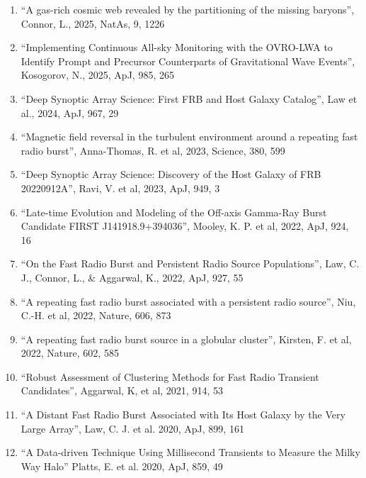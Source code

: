 \documentclass[11pt]{article}
\begin{document}
\begin{enumerate}

    \item ``A gas-rich cosmic web revealed by the partitioning of the missing baryons'', Connor, L., 2025, NatAs, 9, 1226

    \item ``Implementing Continuous All-sky Monitoring with the OVRO-LWA to Identify Prompt and Precursor Counterparts of Gravitational Wave Events'', Kosogorov, N., 2025, ApJ, 985, 265

    \item ``Deep Synoptic Array Science: First FRB and Host Galaxy Catalog'', Law et al., 2024, ApJ, 967, 29

    \item ``Magnetic field reversal in the turbulent environment around a repeating fast radio burst'', Anna-Thomas, R. et al, 2023, Science, 380, 599

    \item ``Deep Synoptic Array Science: Discovery of the Host Galaxy of FRB 20220912A'', Ravi, V. et al, 2023, ApJ, 949, 3

    \item ``Late-time Evolution and Modeling of the Off-axis Gamma-Ray Burst Candidate FIRST J141918.9+394036'', Mooley, K. P. et al, 2022, ApJ, 924, 16

    \item ``On the Fast Radio Burst and Persistent Radio Source Populations'', Law, C. J., Connor, L., \& Aggarwal, K., 2022, ApJ, 927, 55

    \item ``A repeating fast radio burst associated with a persistent radio source'', Niu, C.-H. et al, 2022, Nature, 606, 873

    \item ``A repeating fast radio burst source in a globular cluster'', Kirsten, F. et al, 2022, Nature, 602, 585

    \item ``Robust Assessment of Clustering Methods for Fast Radio Transient Candidates'', Aggarwal, K, et al, 2021, 914, 53

    \item ``A Distant Fast Radio Burst Associated with Its Host Galaxy by the Very Large Array'', Law, C. J. et al. 2020, ApJ, 899, 161

    \item ``A Data-driven Technique Using Millisecond Transients to Measure the Milky Way Halo'' Platts, E. et al. 2020, ApJ, 859, 49


\end{enumerate}
\end{document}
